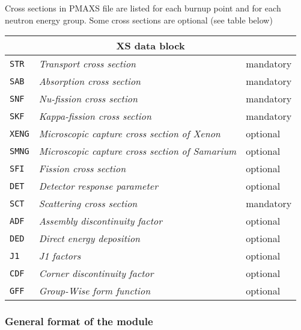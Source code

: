 \vskip 0.2cm


Cross sections in PMAXS file are listed for each burnup point and for each neutron energy group. Some cross sections are optional (see table below)
 
\vskip 0.2cm

\noindent
\begin{tabular}{|p{2cm}|p{11cm}|p{2cm}|}
\hline
\multicolumn{3}{|c|}{\bf XS data block} \\
\hline
{\tt STR} & {\it Transport cross section} & mandatory \\
\hline
{\tt SAB} & {\it Absorption cross section} & mandatory  \\
\hline
{\tt SNF} & {\it Nu-fission cross section} & mandatory  \\
\hline
{\tt SKF} & {\it Kappa-fission cross section} & mandatory  \\
\hline
{\tt XENG} & {\it Microscopic capture cross section of Xenon} & optional  \\
\hline
{\tt SMNG} & {\it Microscopic capture cross section of Samarium} & optional  \\
\hline
{\tt SFI} & {\it Fission cross section } & optional  \\
\hline
{\tt DET} & {\it Detector response parameter} & optional  \\
\hline
{\tt SCT} & {\it Scattering cross section} & mandatory  \\
\hline
{\tt ADF} & {\it Assembly discontinuity factor} & optional  \\
\hline
{\tt DED} & {\it Direct energy deposition} & optional  \\
\hline
{\tt J1} & {\it J1 factors} & optional  \\
\hline
{\tt CDF} & {\it Corner discontinuity factor} & optional  \\
\hline
{\tt GFF} & {\it Group-Wise form function} & optional  \\
\hline
\end{tabular}

\subsubsection{General format of the module}

